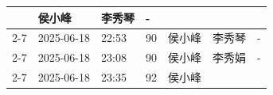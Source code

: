 \documentclass[UTF8,10pt,a4paper,fontset=fandol]{ctexart}
\newcommand{\fieldvalue}[1]{#1}
\newcommand{\handwritten}[1]{#1}
\begin{document}
\begin{center}
\begin{tabular}{|p{1.7cm}|p{1.55cm}|p{1.45cm}|p{1.35cm}|p{1.55cm}|p{1.55cm}|p{1.1cm}|}
&
\fieldvalue{\handwritten{侯小峰}}
&
\fieldvalue{\handwritten{李秀琴}}
&
\fieldvalue{\handwritten{-}}
\\
\cline{2-7}
&
\fieldvalue{\handwritten{2025-06-18}}
&
\fieldvalue{\handwritten{22:53}}
&
\fieldvalue{\handwritten{90}}
&
\fieldvalue{\handwritten{侯小峰}}
&
\fieldvalue{\handwritten{李秀琴}}
&
\fieldvalue{\handwritten{-}}
\\
\cline{2-7}
&
\fieldvalue{\handwritten{2025-06-18}}
&
\fieldvalue{\handwritten{23:08}}
&
\fieldvalue{\handwritten{90}}
&
\fieldvalue{\handwritten{侯小峰}}
&
\fieldvalue{\handwritten{李秀娟}}
&
\fieldvalue{\handwritten{-}}
\\
\cline{2-7}
&
\fieldvalue{\handwritten{2025-06-18}}
&
\fieldvalue{\handwritten{23:35}}
&
\fieldvalue{\handwritten{92}}
&
\fieldvalue{\handwritten{侯小峰}}
&

\end{tabular}
\end{center}
\end{document}
